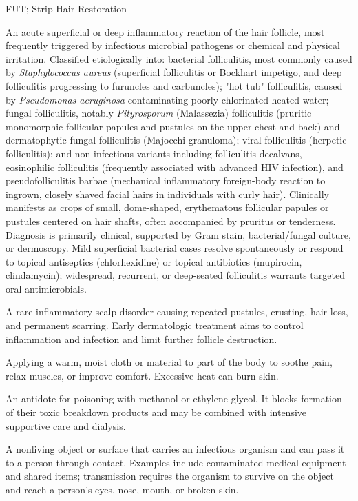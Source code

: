 \synonyms
FUT; Strip Hair Restoration

 An acute superficial or deep inflammatory reaction of the hair follicle, most frequently triggered by infectious microbial pathogens or chemical and physical irritation. Classified etiologically into: bacterial folliculitis, most commonly caused by \textit{Staphylococcus aureus} (superficial folliculitis or Bockhart impetigo, and deep folliculitis progressing to furuncles and carbuncles); "hot tub" folliculitis, caused by \textit{Pseudomonas aeruginosa} contaminating poorly chlorinated heated water; fungal folliculitis, notably \textit{Pityrosporum} (Malassezia) folliculitis (pruritic monomorphic follicular papules and pustules on the upper chest and back) and dermatophytic fungal folliculitis (Majocchi granuloma); viral folliculitis (herpetic folliculitis); and non-infectious variants including folliculitis decalvans, eosinophilic folliculitis (frequently associated with advanced HIV infection), and pseudofolliculitis barbae (mechanical inflammatory foreign-body reaction to ingrown, closely shaved facial hairs in individuals with curly hair). Clinically manifests as crops of small, dome-shaped, erythematous follicular papules or pustules centered on hair shafts, often accompanied by pruritus or tenderness. Diagnosis is primarily clinical, supported by Gram stain, bacterial/fungal culture, or dermoscopy. Mild superficial bacterial cases resolve spontaneously or respond to topical antiseptics (chlorhexidine) or topical antibiotics (mupirocin, clindamycin); widespread, recurrent, or deep-seated folliculitis warrants targeted oral antimicrobials.

 A rare inflammatory scalp disorder causing repeated pustules, crusting, hair loss, and permanent scarring. Early dermatologic treatment aims to control inflammation and infection and limit further follicle destruction.

 Applying a warm, moist cloth or material to part of the body to soothe pain, relax muscles, or improve comfort. Excessive heat can burn skin.

 An antidote for poisoning with methanol or ethylene glycol. It blocks formation of their toxic breakdown products and may be combined with intensive supportive care and dialysis.

 A nonliving object or surface that carries an infectious organism and can pass it to a person through contact. Examples include contaminated medical equipment and shared items; transmission requires the organism to survive on the object and reach a person's eyes, nose, mouth, or broken skin.

